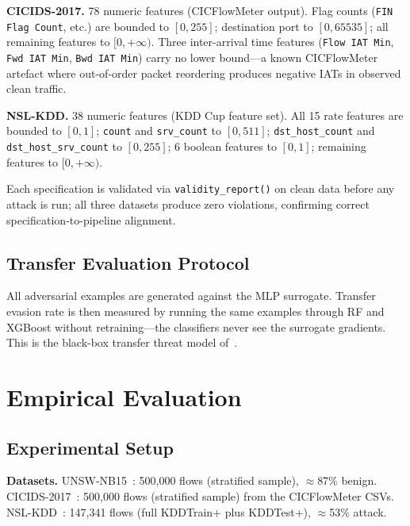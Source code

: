 \documentclass[sigconf,anonymous=true]{acmart}
\begin{document}
\textbf{CICIDS-2017.}  78 numeric features (CICFlowMeter output).
Flag counts (\texttt{FIN Flag Count}, etc.) are bounded to $[0, 255]$;
destination port to $[0, 65535]$; all remaining features to
$[0, +\infty)$.  Three inter-arrival time features
(\texttt{Flow IAT Min}, \texttt{Fwd IAT Min}, \texttt{Bwd IAT Min})
carry no lower bound---a known CICFlowMeter artefact where
out-of-order packet reordering produces negative IATs in observed
clean traffic.

\textbf{NSL-KDD.}  38 numeric features (KDD Cup feature set).
All 15 rate features are bounded to $[0, 1]$; \texttt{count} and
\texttt{srv\_count} to $[0, 511]$; \texttt{dst\_host\_count} and
\texttt{dst\_host\_srv\_count} to $[0, 255]$; 6 boolean features
to $[0, 1]$; remaining features to $[0, +\infty)$.

Each specification is validated via \texttt{validity\_report()} on
clean data before any attack is run; all three datasets produce zero
violations, confirming correct specification-to-pipeline alignment.

\subsection{Transfer Evaluation Protocol}

All adversarial examples are generated against the MLP surrogate.
Transfer evasion rate is then measured by running the same examples
through RF and XGBoost without retraining---the classifiers never see
the surrogate gradients.  This is the black-box transfer threat model
of~\cite{papernot2017practical}.

\section{Empirical Evaluation}
\label{sec:eval}

\subsection{Experimental Setup}

\textbf{Datasets.}
UNSW-NB15~\cite{moustafa2015unsw}: 500,000 flows (stratified sample),
$\approx$87\% benign.
CICIDS-2017~\cite{sharafaldin2018generating}: 500,000 flows (stratified
sample) from the CICFlowMeter CSVs.
NSL-KDD~\cite{tavallaee2009detailed}: 147,341 flows (full KDDTrain+
plus KDDTest+), $\approx$53\% attack.
\end{document}
